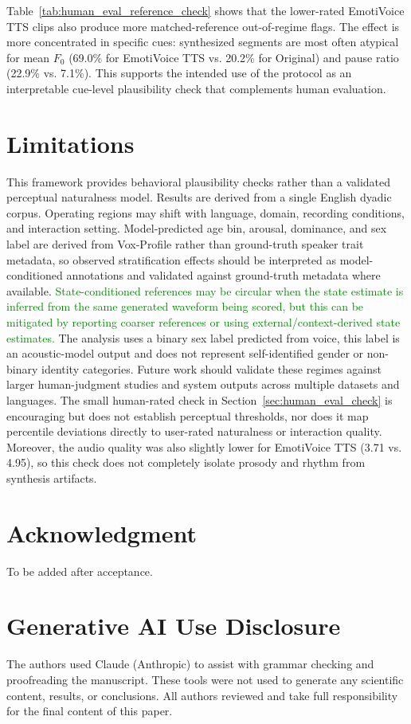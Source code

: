 \documentclass[conference]{IEEEtran}
\begin{document}
Table~\ref{tab:human_eval_reference_check} shows that the lower-rated EmotiVoice TTS clips also produce more matched-reference out-of-regime flags. 
The effect is more concentrated in specific cues: synthesized segments are most often atypical for mean $F_0$ (69.0\% for EmotiVoice TTS vs. 20.2\% for Original) and pause ratio (22.9\% vs. 7.1\%). 
This supports the intended use of the protocol as an interpretable cue-level plausibility check that complements human evaluation.

\section{Limitations}\label{sec:limitations}
This framework provides behavioral plausibility checks rather than a validated perceptual naturalness model. 
Results are derived from a single English dyadic corpus. 
Operating regions may shift with language, domain, recording conditions, and interaction setting. 
Model-predicted age bin, arousal, dominance, and sex label are derived from Vox-Profile rather than ground-truth speaker trait metadata, so observed stratification effects should be interpreted as model-conditioned annotations and validated against ground-truth metadata where available.
\textcolor{green}{State-conditioned references may be circular when the state estimate is inferred from the same generated waveform being scored, but this can be mitigated by reporting coarser references or using external/context-derived state estimates.}
The analysis uses a binary sex label predicted from voice, this label is an acoustic-model output and does not represent self-identified gender or non-binary identity categories.
Future work should validate these regimes against larger human-judgment studies and system outputs across multiple datasets and languages.
The small human-rated check in Section~\ref{sec:human_eval_check} is encouraging but does not establish perceptual thresholds, nor does it map percentile deviations directly to user-rated naturalness or interaction quality. 
Moreover, the audio quality was also slightly lower for EmotiVoice TTS (3.71 vs. 4.95), so this check does not completely isolate prosody and rhythm from synthesis artifacts. 

\newpage

\section*{Acknowledgment}

To be added after acceptance.

\section{Generative AI Use Disclosure}
The authors used Claude (Anthropic) to assist with grammar checking and proofreading the manuscript. These tools were not used to generate any scientific content, results, or conclusions. All authors reviewed and take full responsibility for the final content of this paper.



\end{document}
